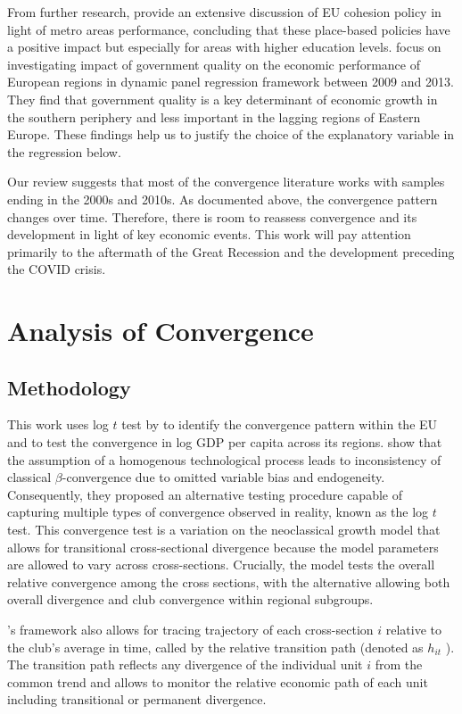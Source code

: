 \documentclass[11pt]{article}
\begin{document}
From further research, \citet{ehrlich2020place} provide an extensive discussion of EU cohesion policy in light of metro areas performance, concluding that these place-based policies have a positive impact but especially for areas with higher education levels. \citet{rodriguez2020institutional} focus on investigating impact of government quality on the economic performance of European regions in dynamic panel regression framework between 2009 and 2013. They find that government quality is a key determinant of economic growth in the southern periphery and less important in the lagging regions of Eastern Europe. These findings help us to justify the choice of the explanatory variable in the regression below.

Our review suggests that most of the convergence literature works with samples ending in the 2000s and 2010s. As documented above, the convergence pattern changes over time. Therefore, there is room to reassess convergence and its development in light of  key economic events. This work will pay attention primarily to the aftermath of the Great Recession and the development preceding the COVID crisis.

\section{Analysis of Convergence}
\subsection{Methodology}

This work uses log $t$ test by \citet{phillips2007transition}  to identify the convergence pattern within the EU and to test the convergence in log GDP per capita across its regions. \citet{phillips2007transition} show that the assumption of a homogenous technological process  leads to inconsistency of classical $\beta$-convergence due to omitted variable bias and endogeneity. Consequently, they proposed an alternative testing procedure capable of capturing multiple types of convergence observed in reality, known as the log $t$ test. This convergence test is a variation on the neoclassical growth model that allows for transitional cross-sectional divergence  because the model parameters are allowed to vary across cross-sections.  Crucially, the model tests the overall relative convergence among the cross sections, with the alternative allowing both overall divergence and club convergence within regional subgroups. 

\citeauthor{phillips2009economic}'s framework also allows for tracing  trajectory of each cross-section $i$ relative to the club's average in time, called by \citet{phillips2009economic} the relative transition path (denoted as $h_{it}$ ). The transition path reflects any divergence of the individual unit $i$ from the common trend and allows to monitor the relative economic path of each unit including transitional or permanent divergence.
\end{document}
